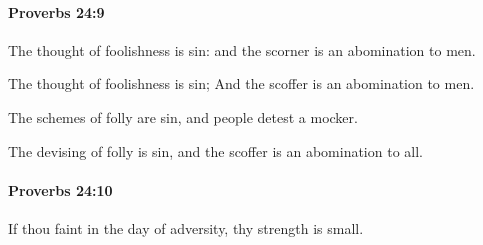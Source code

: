		\paragraph{Proverbs 24:9} %
			\label{PROVERBS-24-9}

			The thought of foolishness is sin: and the scorner is an abomination to men.

			\begin{versebox}
					\item[BHS] 
					\item[ASV] The thought of foolishness is sin; And the scoffer is an abomination to men.
					\item[NIV] The schemes of folly are sin, and people detest a mocker.
					\item[NRSV] The devising of folly is sin, and the scoffer is an abomination to all.
			\end{versebox}

		\paragraph{Proverbs 24:10} %
			\label{PROVERBS-24-10}

			If thou faint in the day of adversity, thy strength is small.

